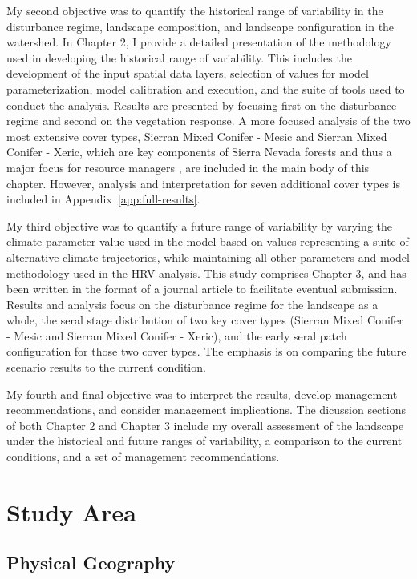 My second objective was to quantify the historical range of variability in the disturbance regime, landscape composition, and landscape configuration in the watershed. In Chapter 2, I provide a detailed presentation of the methodology used in developing the historical range of variability. This includes the development of the input spatial data layers, selection of values for model parameterization, model calibration and execution, and the suite of tools used to conduct the analysis. Results are presented by focusing first on the disturbance regime and second on the vegetation response. A more focused analysis of the two most extensive cover types, Sierran Mixed Conifer - Mesic and Sierran Mixed Conifer - Xeric, which are key components of Sierra Nevada forests and thus a major focus for resource managers \citep{North2010}, are included in the main body of this chapter. However, analysis and interpretation for seven additional cover types is included in Appendix~\ref{app:full-results}. 

My third objective was to quantify a future range of variability by varying the climate parameter value used in the model based on values representing a suite of alternative climate trajectories, while maintaining all other parameters and model methodology used in the HRV analysis. This study comprises Chapter 3, and has been written in the format of a journal article to facilitate eventual submission. Results and analysis focus on the disturbance regime for the landscape as a whole, the seral stage distribution of two key cover types (Sierran Mixed Conifer - Mesic and Sierran Mixed Conifer - Xeric), and the early seral patch configuration for those two cover types. The emphasis is on comparing the future scenario results to the current condition. 

My fourth and final objective was to interpret the results, develop management recommendations, and consider management implications. The dicussion sections of both Chapter 2 and Chapter 3 include my overall assessment of the landscape under the historical and future ranges of variability, a comparison to the current conditions, and a set of management recommendations. 


\section{Study Area}

\subsection{Physical Geography}

